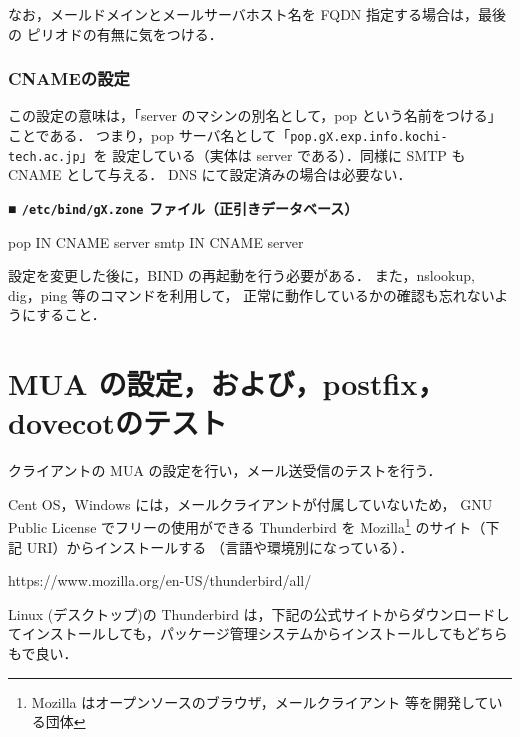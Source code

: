 なお，メールドメインとメールサーバホスト名を FQDN 指定する場合は，最後の
ピリオドの有無に気をつける．

\subsubsection{CNAMEの設定}
この設定の意味は，「server のマシンの別名として，pop という名前をつける」ことである．
つまり，pop サーバ名として「\texttt{pop.gX.exp.info.kochi-tech.ac.jp}」を
設定している（実体は server である）．同様に SMTP も CNAME として与える．
DNS にて設定済みの場合は必要ない．

\noindent
{\bf ■ \texttt{/etc/bind/gX.zone} ファイル（正引きデータベース）}
\begin{cli}
pop       IN      CNAME   server
smtp       IN      CNAME   server
\end{cli}

設定を変更した後に，BIND の再起動を行う必要がある．
また，nslookup, dig，ping 等のコマンドを利用して，
正常に動作しているかの確認も忘れないようにすること．

\section{MUA の設定，および，postfix，dovecotのテスト}
クライアントの MUA の設定を行い，メール送受信のテストを行う．

Cent OS，Windows には，メールクライアントが付属していないため，
GNU Public License でフリーの使用ができる Thunderbird を
Mozilla\footnote{Mozilla はオープンソースのブラウザ，メールクライアント
等を開発している団体} のサイト（下記 URI）からインストールする
（言語や環境別になっている）．

\begin{center}
https://www.mozilla.org/en-US/thunderbird/all/ 
\end{center}

Linux (デスクトップ)の Thunderbird は，下記の公式サイトからダウンロードしてインストールしても，パッケージ管理システムからインストールしてもどちらもで良い．

